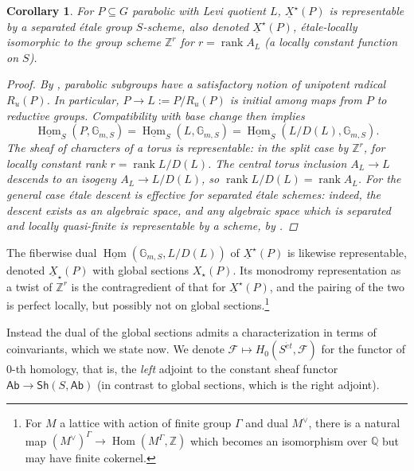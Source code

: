 \documentclass[openany]{amsbook}
\newtheorem{corollary}[theorem]{Corollary}
\theoremstyle{definition}
\theoremstyle{remark}
\numberwithin{equation}{section}
\newcommand{\Q}{\mathbb{Q}}
\newcommand{\Z}{\mathbb{Z}}
\newcommand{\G}{\mathbb{G}}
\newcommand{\cF}{\mathcal{F}}
\newcommand{\ul}[1]{\underline{#1}}
\renewcommand{\-}{\operatorname{-}}
\newcommand{\Hom}{\operatorname{Hom}}
\newcommand{\Ab}{\mathsf{Ab}}
\newcommand{\Sh}{\mathsf{Sh}}
\newcommand{\on}[1]{\operatorname{#1}}
\newcommand{\rank}{\on{rank}}
\newcommand{\et}{\acute{e}t}
\begin{document}
\begin{corollary}
    For $P \subseteq G$ parabolic with Levi quotient $L$, $\ul{X}^\star(P)$ is representable by a separated \'etale group $S$-scheme, also denoted $\ul{X}^\star(P)$, \'etale-locally isomorphic to the group scheme $\Z^r$ for $r = \rank A_L$ (a locally constant function on $S$). 
    \begin{proof}
        By \cite[Cor. 5.2.5]{conradrgs}, parabolic subgroups have a satisfactory notion of unipotent radical $R_u(P)$. In particular, $P \to L := P/R_u(P)$ is initial among maps from $P$ to reductive groups. Compatibility with base change then implies
        \[
            \ul{\Hom}_S(P, \G_{m,S}) = \ul{\Hom}_S(L, \G_{m,S}) = \ul{\Hom}_S(L/D(L), \G_{m,S}).
        \]
        The sheaf of characters of a torus is representable: in the split case by $\Z^r$, for locally constant rank $r = \rank L/D(L)$. The central torus inclusion $A_L\to  L$ descends to an isogeny $A_L \to L/D(L)$, so $\rank L/D(L) = \rank A_L$. For the general case \'etale descent is effective for separated \'etale schemes: indeed, the descent exists as an algebraic space, and any algebraic space which is separated and locally quasi-finite is representable by a scheme, by \cite[\href{https://stacks.math.columbia.edu/tag/03XX}{Tag 03XX}]{stacks-project}.
    \end{proof}
\end{corollary}

The fiberwise dual $\ul{\Hom}(\G_{m,S}, L/D(L))$ of $\ul{X}^\star(P)$ is likewise representable, denoted $\ul{X}_\star(P)$ with global sections $X_\star(P)$. Its monodromy representation as a twist of $\Z^r$ is the contragredient of that for $\ul{X}^\star(P)$, and the pairing of the two is perfect locally, but possibly not on global sections.\footnote{For $M$ a lattice with action of finite group $\Gamma$ and dual $M^\vee$, there is a natural map $(M^\vee)^\Gamma \to \Hom(M^\Gamma, \Z)$ which becomes an isomorphism over $\Q$ but may have finite cokernel.} 

Instead the dual of the global sections admits a characterization in terms of coinvariants, which we state now. We denote $\cF \mapsto H_0(S^{\et}, \cF)$ for the functor of 0-th homology, that is, the \emph{left} adjoint to the constant sheaf functor $\Ab \to \Sh(S, \Ab)$ (in contrast to global sections, which is the right adjoint).
\end{document}
